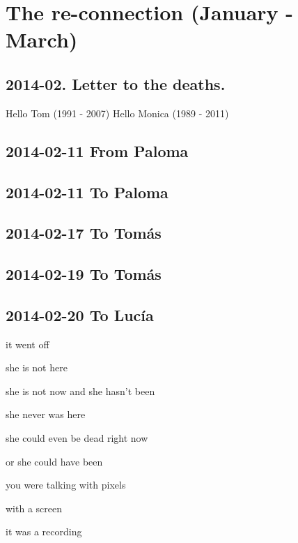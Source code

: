 \documentclass[]{book}
\begin{document}
\hypertarget{reconnect}{%
\chapter{The re-connection (January - March)}\label{reconnect}}

\hypertarget{letter-to-the-deaths.}{%
\section{2014-02. Letter to the deaths.}\label{letter-to-the-deaths.}}

Hello Tom (1991 - 2007)
Hello Monica (1989 - 2011)

\hypertarget{from-paloma}{%
\section{2014-02-11 From Paloma}\label{from-paloma}}

\hypertarget{to-paloma}{%
\section{2014-02-11 To Paloma}\label{to-paloma}}

\hypertarget{to-tomas-2}{%
\section{2014-02-17 To Tomás}\label{to-tomas-2}}

\hypertarget{to-tomas-3}{%
\section{2014-02-19 To Tomás}\label{to-tomas-3}}

\hypertarget{to-lucia}{%
\section{2014-02-20 To Lucía}\label{to-lucia}}

it went off

she is not here

she is not now and she hasn't been

she never was here

she could even be dead right now

or she could have been

you were talking with pixels

with a screen

it was a recording
\end{document}
